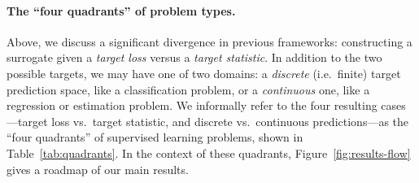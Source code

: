 \documentclass[11pt]{article} %
\newcommand{\Ind}[1]{\mathbf{I}\{{#1}\}}
\begin{document}

\paragraph{The ``four quadrants'' of problem types.}
Above, we discuss a significant divergence in previous frameworks: constructing a surrogate given a \emph{target loss} versus a \emph{target statistic}.
In addition to the two possible targets, we may have one of two domains: a \emph{discrete} (i.e.\ finite) target prediction space, like a classification problem, or a \emph{continuous} one, like a regression or estimation problem.
We informally refer to the four resulting cases---target loss vs.\ target statistic, and discrete vs.\ continuous predictions---as the ``four quadrants'' of supervised learning problems, shown in Table~\ref{tab:quadrants}.
In the context of these quadrants, Figure~\ref{fig:results-flow} gives a roadmap of our main results.
\end{document}
